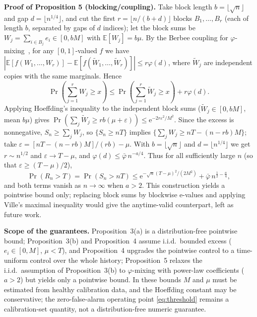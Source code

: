 \documentclass[journal]{IEEEtran}
\newcommand{\E}{\mathbb{E}}
\newcommand{\Prb}{\Pr}
\begin{document}
\textbf{Proof of Proposition 5 (blocking/coupling).} Take block length $b=\lfloor\sqrt n\rfloor$ and gap $d=\lfloor n^{1/4}\rfloor$, and cut the first $r=\lfloor n/(b+d)\rfloor$ blocks $B_1,\dots,B_r$ (each of length $b$, separated by gaps of $d$ indices); let the block sums be $W_j=\sum_{i\in B_j}e_i\in[0,bM]$ with $\E[W_j]=b\mu$. By the Berbee coupling for $\varphi$-mixing~\cite{yu1994rates}, for any $[0,1]$-valued $f$ we have $\left|\E[f(W_1,\dots,W_r)]-\E[f(\tilde W_1,\dots,\tilde W_r)]\right|\le r\varphi(d)$, where $\tilde W_j$ are independent copies with the same marginals. Hence
\begin{equation}
\Prb\!\left(\sum_{j=1}^{r}W_j\ge x\right)\le\Prb\!\left(\sum_{j=1}^{r}\tilde W_j\ge x\right)+r\varphi(d).
\end{equation}
Applying Hoeffding's inequality to the independent block sums ($\tilde W_j\in[0,bM]$, mean $b\mu$) gives $\Prb(\sum_j\tilde W_j\ge rb(\mu+\varepsilon))\le\mathrm{e}^{-2r\varepsilon^2/M^2}$. Since the excess is nonnegative, $S_n\ge\sum_j W_j$, so $\{S_n\ge nT\}$ implies $\{\sum_j W_j\ge nT-(n-rb)M\}$; take $\varepsilon=[nT-(n-rb)M]/(rb)-\mu$. With $b=\lfloor\sqrt n\rfloor$ and $d=\lfloor n^{1/4}\rfloor$ we get $r\sim n^{1/2}$ and $\varepsilon\to T-\mu$, and $\varphi(d)\le\bar\varphi\,n^{-a/4}$. Thus for all sufficiently large $n$ (so that $\varepsilon\ge(T-\mu)/2$),
\begin{equation}
\Prb(R_n>T)=\Prb(S_n>nT)\le\mathrm{e}^{-\sqrt n(T-\mu)^2/(2M^2)}+\bar\varphi\,n^{\frac12-\frac a4},
\end{equation}
and both terms vanish as $n\to\infty$ when $a>2$. This construction yields a pointwise bound only; replacing block sums by blockwise e-values and applying Ville's maximal inequality would give the anytime-valid counterpart, left as future work.

\textbf{Scope of the guarantees.} Proposition~3(a) is a distribution-free pointwise bound; Proposition~3(b) and Proposition~4 assume i.i.d.\ bounded excess ($e_i\in[0,M]$, $\mu<T$), and Proposition~4 upgrades the pointwise control to a time-uniform control over the whole history; Proposition~5 relaxes the i.i.d.\ assumption of Proposition~3(b) to $\varphi$-mixing with power-law coefficients ($a>2$) but yields only a pointwise bound. In these bounds $M$ and $\mu$ must be estimated from healthy calibration data, and the Hoeffding constant may be conservative; the zero-false-alarm operating point \eqref{eq:threshold} remains a calibration-set quantity, not a distribution-free numeric guarantee.
\end{document}
